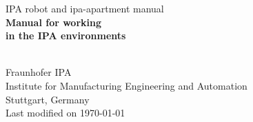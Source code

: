 %
%
\begin{titlepage}
\vspace*{13mm}
\begin{center}
  \vspace{10mm} 
         {\large \hspace{20mm} IPA robot and ipa-apartment manual\\}
  \vspace{10mm}
       {\Large
          \bf
          \hspace{20mm} Manual for working\\} 
  \vspace{5mm}
       {\Large
          \bf
          \hspace{20mm} in the IPA environments\\}

  \vspace{80mm}
  \makebox[40mm]{}\\
  \vspace{10mm}
         {\large \hspace{20mm} Fraunhofer IPA} \\
  \vspace{5mm}
         {\large \hspace{20mm} Institute for Manufacturing Engineering and Automation} \\
         {\large \hspace{20mm} Stuttgart, Germany} \\
  \vfill
         {\large \hspace{20mm} Last modified on \today}
\end{center}
\end{titlepage}

\clearpage
\thispagestyle{empty}
\cleardoublepage